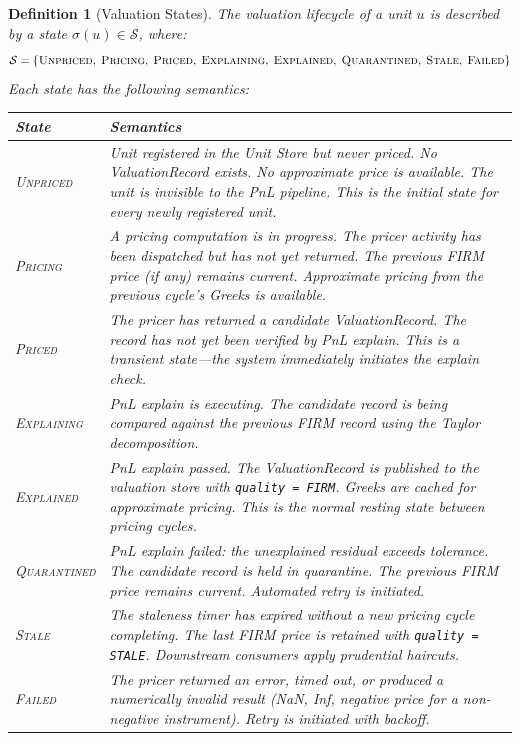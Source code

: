 \documentclass[11pt,a4paper]{article}
\newtheorem{definition}{Definition}[section]
\begin{document}
\begin{definition}[Valuation States]
\label{def:val-states}
The valuation lifecycle of a unit $u$ is described by a state $\sigma(u) \in \mathcal{S}$, where:
\[
\mathcal{S} = \{\textsc{Unpriced},\; \textsc{Pricing},\; \textsc{Priced},\; \textsc{Explaining},\; \textsc{Explained},\; \textsc{Quarantined},\; \textsc{Stale},\; \textsc{Failed}\}
\]
Each state has the following semantics:

\begin{center}
\small
\begin{tabular}{l p{9cm}}
\toprule
\textbf{State} & \textbf{Semantics} \\
\midrule
\textsc{Unpriced} & Unit registered in the Unit Store but never priced.  No ValuationRecord exists.  No approximate price is available.  The unit is invisible to the PnL pipeline.  This is the initial state for every newly registered unit. \\
\textsc{Pricing} & A pricing computation is in progress.  The pricer activity has been dispatched but has not yet returned.  The previous FIRM price (if any) remains current.  Approximate pricing from the previous cycle's Greeks is available. \\
\textsc{Priced} & The pricer has returned a candidate ValuationRecord.  The record has not yet been verified by PnL explain.  This is a transient state---the system immediately initiates the explain check. \\
\textsc{Explaining} & PnL explain is executing.  The candidate record is being compared against the previous FIRM record using the Taylor decomposition. \\
\textsc{Explained} & PnL explain passed.  The ValuationRecord is published to the valuation store with \texttt{quality = FIRM}.  Greeks are cached for approximate pricing.  This is the normal resting state between pricing cycles. \\
\textsc{Quarantined} & PnL explain failed: the unexplained residual exceeds tolerance.  The candidate record is held in quarantine.  The previous FIRM price remains current.  Automated retry is initiated. \\
\textsc{Stale} & The staleness timer has expired without a new pricing cycle completing.  The last FIRM price is retained with \texttt{quality = STALE}.  Downstream consumers apply prudential haircuts. \\
\textsc{Failed} & The pricer returned an error, timed out, or produced a numerically invalid result (NaN, Inf, negative price for a non-negative instrument).  Retry is initiated with backoff. \\
\bottomrule
\end{tabular}
\end{center}
\end{definition}
\end{document}
